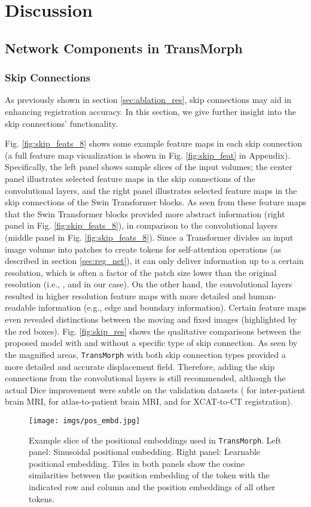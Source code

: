\documentclass[times,twocolumn,final]{elsarticle}
\begin{document}
\section{Discussion}
\label{sec:discussion}

\subsection{Network Components in TransMorph}
\label{sec:net_ele_discuss}
\subsubsection{Skip Connections}

As previously shown in section \ref{sec:ablation_res}, skip connections may aid in enhancing registration accuracy. In this section, we give further insight into the skip connections' functionality. 

Fig. \ref{fig:skip_feats_8} shows some example feature maps in each skip connection (a full feature map visualization is shown in Fig. \ref{fig:skip_feat} in Appendix). Specifically, the left panel shows sample slices of the input volumes; the center panel illustrates selected feature maps in the skip connections of the convolutional layers, and the right panel illustrates selected feature maps in the skip connections of the Swin Transformer blocks. As seen from these feature maps that the Swin Transformer blocks provided more abstract information (right panel in Fig. \ref{fig:skip_feats_8}), in comparison to the convolutional layers (middle panel in Fig. \ref{fig:skip_feats_8}). Since a Transformer divides an input image volume into patches to create tokens for self-attention operations (as described in section \ref{sec:reg_net}), it can only deliver information up to a certain resolution, which is often a factor of the patch size lower than the original resolution (i.e., , and  in our case). On the other hand, the convolutional layers resulted in higher resolution feature maps with more detailed and human-readable information (e.g., edge and boundary information). Certain feature maps even revealed distinctions between the moving and fixed images (highlighted by the red boxes). Fig. \ref{fig:skip_res} shows the qualitative comparisons between the proposed model with and without a specific type of skip connection. As seen by the magnified areas, \texttt{TransMorph} with both skip connection types provided a more detailed and accurate displacement field. Therefore, adding the skip connections from the convolutional layers is still recommended, although the actual Dice improvement were subtle on the validation datasets ( for inter-patient brain MRI,  for atlas-to-patient brain MRI, and  for XCAT-to-CT registration).
\begin{figure}[!h]
\centering
\texttt{[image: imgs/pos\_embd.jpg]}
\caption{Example slice of the positional embeddings used in \texttt{TransMorph}. Left panel: Sinusoidal positional embedding. Right panel: Learnable positional embedding. Tiles in both panels show the cosine similarities between the position embedding of the token with the indicated row and column and the position embeddings of all other tokens.\label{fig:pos_embed}}
\end{figure}
\end{document}
